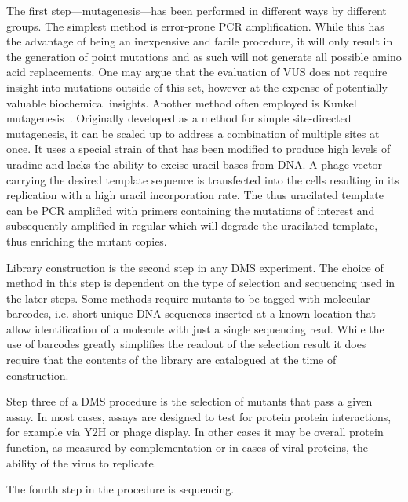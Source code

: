 The first step---mutagenesis---has been performed in different ways by different groups. The simplest method is error-prone PCR amplification\cite{oxPCRetc}. While this has the advantage of being an inexpensive and facile procedure, it will only result in the generation of point mutations and as such will not generate all possible amino acid replacements. One may argue that the evaluation of VUS does not require insight into mutations outside of this set, however at the expense of potentially valuable biochemical insights. Another method often employed is Kunkel mutagenesis~\cite{Kunkel}. Originally developed as a method for simple site-directed mutagenesis, it can be scaled up to address a combination of multiple sites at once. It uses a special strain of  that has been modified to produce high levels of uradine and lacks the ability to excise uracil bases from DNA. A phage vector carrying the desired template sequence is transfected into the cells resulting in its replication with a high uracil incorporation rate. The thus uracilated template can be PCR amplified with primers containing the mutations of interest and subsequently amplified in regular  which will degrade the uracilated template, thus enriching the mutant copies. %

Library construction is the second step in any DMS experiment. The choice of method in this step is dependent on the type of selection and sequencing used in the later steps. Some methods require mutants to be tagged with molecular barcodes, i.e. short unique DNA sequences inserted at a known location that allow identification of a molecule with just a single sequencing read. While the use of barcodes greatly simplifies the readout of the selection result it does require that the contents of the library are catalogued at the time of construction.

Step three of a DMS procedure is the selection of mutants that pass a given assay. In most cases, assays are designed to test for protein protein interactions, for example via Y2H or phage display. In other cases it may be overall protein function, as measured by complementation or in cases of viral proteins, the ability of the virus to replicate.

The fourth step in the procedure is sequencing. 


